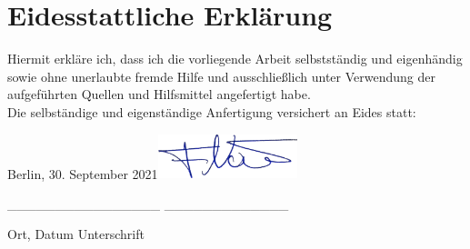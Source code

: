 \thispagestyle{empty}
\section*{Eidesstattliche Erklärung}
Hiermit erkläre ich, dass ich die vorliegende Arbeit selbstständig und eigenhändig sowie ohne unerlaubte fremde Hilfe und ausschließlich unter Verwendung der aufgeführten Quellen und Hilfsmittel angefertigt habe.\\

\noindent Die selbständige und eigenständige Anfertigung versichert an Eides statt:

\vspace{3cm}

\noindent\hspace{1cm} Berlin, 30. September 2021\hfill\includegraphics[width=115pt]{../images/signature/signature.png} \hspace{1.4cm}
\vspace{-0,6cm}

\noindent\hspace{0,95cm} \_\_\_\_\_\_\_\_\_\_\_\_\_\_\_\_ \hfill \_\_\_\_\_\_\_\_\_\_\_\_\_ \hspace{1.3cm}
\vspace{-0,1cm}

\noindent\hspace{2,35cm} Ort, Datum \hfill Unterschrift \hspace{2,35cm}

